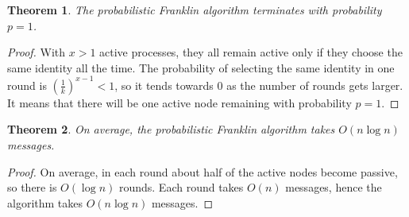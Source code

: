 \documentclass[a4paper,12pt]{article}
\newtheorem{theorem}{Theorem}
\begin{document}
\begin{theorem}
    The probabilistic Franklin algorithm terminates with probability $p = 1$.
\end{theorem}
\begin{proof}
    With $x > 1$ active processes, they all remain active only if they choose the same identity all the time. The probability of selecting the same identity in one round is $\left( \frac{1}{k} \right)^{x-1} < 1$, so it tends towards 0 as the number of rounds gets larger. It means that there will be one active node remaining with probability $p=1$.
\end{proof}

\begin{theorem}
    On average, the probabilistic Franklin algorithm takes $O(n \log n)$ messages.
\end{theorem}
\begin{proof}
    On average, in each round about half of the active nodes become passive, so there is $O(\log n)$ rounds. Each round takes $O(n)$ messages, hence the algorithm takes $O(n \log n)$ messages.
\end{proof}

\printbibliography
\end{document}

